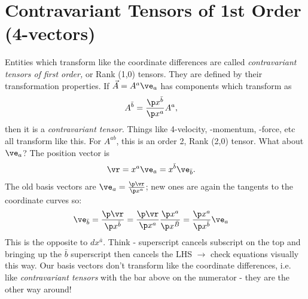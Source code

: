 \documentclass[a4paper, 11pt, normalem]{report}
\begin{document}
\section{Contravariant Tensors of 1st Order (4-vectors)}
Entities which transform like the coordinate differences are called \emph{contravariant tensors of first order,} or Rank (1,0) tensors. 
They are defined by their transformation properties.
If $\vec{A}=A^a\ve_a$ has components which transform as 
\begin{align}
    A^{\bar{b}} &= \frac{\p x^{\bar{b}}}{\p x^a}A^a,
\end{align}
then it is a \emph{contravariant tensor.}
Things like 4-velocity, -momentum, -force, etc all transform like this. 
For $A^{ab}$, this is an order 2, Rank (2,0) tensor.
What about $\ve_a$?
The position vector is
\begin{align}
    \vr &= x^a\ve_a = x^{\bar{b}}\ve_{\bar{b}}.
\end{align}
The old basis vectors are $\ve_a=\frac{\p\vr}{\p x^a}$; new ones are again the tangents to the coordinate curves so:
\begin{align}
    \ve_{\bar{b}} &= \frac{\p\vr}{\p x^{\bar{b}}} = \frac{\p\vr}{\p x^a} \frac{\p x^a}{\p x^{\bar{B}}} = \frac{\p x^a}{\p x^{\bar{b}}}\ve_a
\end{align}
This is the opposite to $dx^{\bar{a}}$.
Think - superscript cancels subscript on the top and bringing up the $\bar{b}$ superscript then cancels the LHS $\to$ check equations visually this way. 
Our basis vectors don't transform like the coordinate differences, i.e. like \emph{contravariant tensors} with the bar above on the numerator - they are the other way around!
\end{document}
